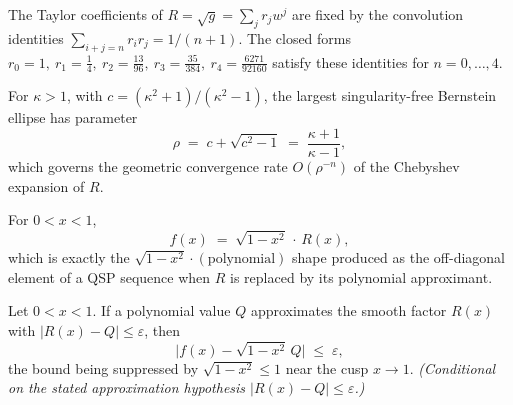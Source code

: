 \begin{lemma}
  \label{lem:qsp-coeff}
  The Taylor coefficients of $R = \sqrt{g} = \sum_j r_j w^j$ are fixed by the
  convolution identities $\sum_{i+j=n} r_i r_j = 1/(n+1)$. The closed forms
  $r_0=1,\ r_1=\tfrac14,\ r_2=\tfrac{13}{96},\ r_3=\tfrac{35}{384},\
  r_4=\tfrac{6271}{92160}$ satisfy these identities for $n = 0,\dots,4$.
\end{lemma}

\begin{proposition}
  \label{prop:qsp-rho}
  For $\kappa > 1$, with $c = (\kappa^2+1)/(\kappa^2-1)$, the largest
  singularity-free Bernstein ellipse has parameter
  \[
    \rho \;=\; c + \sqrt{c^2 - 1} \;=\; \frac{\kappa+1}{\kappa-1},
  \]
  which governs the geometric convergence rate $O(\rho^{-n})$ of the Chebyshev
  expansion of $R$.
\end{proposition}

\begin{theorem}
  \label{thm:qsp-ffactor}
  For $0 < x < 1$,
  \[
    f(x) \;=\; \sqrt{1 - x^2}\,\cdot\,R(x),
  \]
  which is exactly the $\sqrt{1-x^2}\cdot(\text{polynomial})$ shape produced as
  the off-diagonal element of a QSP sequence when $R$ is replaced by its
  polynomial approximant.
\end{theorem}

\begin{theorem}
  \label{thm:qsp-error}
  Let $0 < x < 1$. If a polynomial value $Q$ approximates the smooth factor
  $R(x)$ with $|R(x) - Q| \le \varepsilon$, then
  \[
    \bigl| f(x) - \sqrt{1 - x^2}\,Q \bigr| \;\le\; \varepsilon,
  \]
  the bound being suppressed by $\sqrt{1-x^2} \le 1$ near the cusp $x \to 1$.
  \emph{(Conditional on the stated approximation hypothesis $|R(x)-Q|\le\varepsilon$.)}
\end{theorem}
